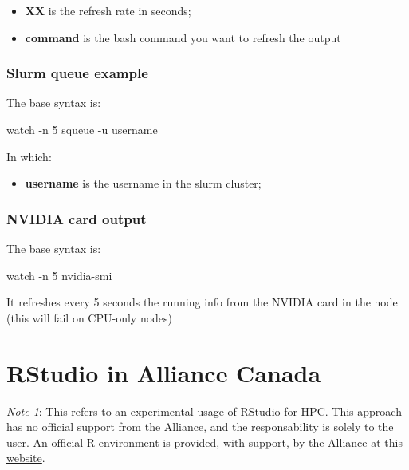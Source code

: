 \documentclass[
]{book}
\newenvironment{Shaded}{\begin{snugshade}}{\end{snugshade}}
\newcommand{\AttributeTok}[1]{\textcolor[rgb]{0.77,0.63,0.00}{#1}}
\newcommand{\ExtensionTok}[1]{#1}
\newcommand{\NormalTok}[1]{#1}
\providecommand{\tightlist}{%
  \setlength{\itemsep}{0pt}\setlength{\parskip}{0pt}}
\begin{document}
\begin{itemize}
\tightlist
\item
  \textbf{XX} is the refresh rate in seconds;
\item
  \textbf{command} is the bash command you want to refresh the output
\end{itemize}

\hypertarget{slurm-queue-example}{%
\subsection{Slurm queue example}\label{slurm-queue-example}}

The base syntax is:

\begin{Shaded}
\begin{Highlighting}[]
\ExtensionTok{watch} \AttributeTok{{-}n}\NormalTok{ 5 squeue }\AttributeTok{{-}u}\NormalTok{ username}
\end{Highlighting}
\end{Shaded}

In which:

\begin{itemize}
\tightlist
\item
  \textbf{username} is the username in the slurm cluster;
\end{itemize}

\hypertarget{nvidia-card-output}{%
\subsection{NVIDIA card output}\label{nvidia-card-output}}

The base syntax is:

\begin{Shaded}
\begin{Highlighting}[]
\ExtensionTok{watch} \AttributeTok{{-}n}\NormalTok{ 5 nvidia{-}smi}
\end{Highlighting}
\end{Shaded}

It refreshes every 5 seconds the running info from the NVIDIA card in the node (this will fail on CPU-only nodes)

\hypertarget{rstudio-in-alliance-canada}{%
\chapter{RStudio in Alliance Canada}\label{rstudio-in-alliance-canada}}

\emph{Note 1}: This refers to an experimental usage of RStudio for HPC. This approach
has no official support from the Alliance, and the responsability is solely to
the user. An official R environment is provided, with support, by the Alliance at
\href{https://docs.alliancecan.ca/wiki/Technical_documentation}{this website}.
\end{document}
